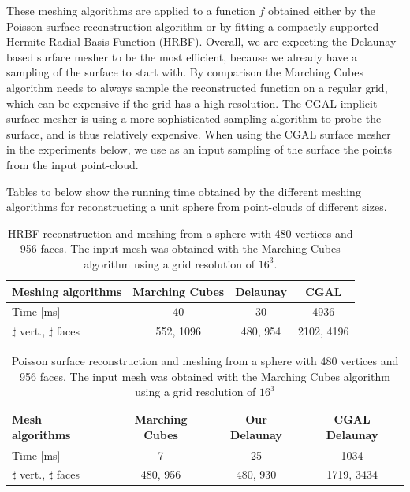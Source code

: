 \documentclass{article}
\begin{document}
These meshing algorithms are applied to a function $f$ obtained either by the Poisson surface reconstruction algorithm or by fitting a compactly supported Hermite Radial Basis Function (HRBF).
Overall, we are expecting the Delaunay based surface mesher to be the most efficient, because we already have a sampling of the surface to start with. By comparison the Marching Cubes algorithm needs to always sample the reconstructed function on a regular grid, which can be expensive if the grid has a high resolution.
The CGAL implicit surface mesher is using a more sophisticated sampling algorithm to probe the surface, and is thus relatively expensive. When using the CGAL surface mesher in the experiments below, we use as an input sampling of the surface the points from the input point-cloud.

Tables \label{hrbf_16} to \label{Pois_256} below show the running time obtained by the different meshing algorithms for reconstructing a unit sphere from point-clouds of different sizes.

\begin{table}
 \caption{HRBF reconstruction and meshing from a sphere with 480 vertices and 956 faces. The input mesh was obtained with the Marching Cubes algorithm using a grid resolution of $16^3$.}
\label{hrbf_16}
  \begin{tabular}{|l|c|c|c|} \hline
    Meshing algorithms & Marching Cubes & Delaunay & CGAL \\  \hline
    Time [ms] & 40 & 30 & 4936\\ \hline
    $\sharp$ vert., $\sharp$ faces & 552, 1096 & 480, 954 &2102, 4196 \\ \hline
  \end{tabular}
\end{table}

\begin{table}
 \caption{Poisson surface reconstruction and meshing from a sphere with 480 vertices and 956 faces. The input mesh was obtained with the Marching Cubes algorithm using a grid resolution of $16^3$}
\label{Pois_16}
  \begin{tabular}{|l|c|c|c|} \hline
    Mesh algorithms & Marching Cubes & Our Delaunay & CGAL Delaunay \\  \hline
    Time [ms] & 7 & 25 & 1034\\ \hline
    $\sharp$ vert., $\sharp$ faces & 480, 956 & 480, 930 &1719, 3434 \\ \hline
  \end{tabular}
\end{table}
\end{document}

